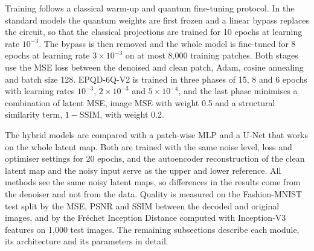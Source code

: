 Training follows a classical warm-up and quantum fine-tuning protocol. In the standard models the quantum weights are first frozen and a linear bypass replaces the circuit, so that the classical projections are trained for 10 epochs at learning rate $10^{-3}$. The bypass is then removed and the whole model is fine-tuned for 8 epochs at learning rate $3\times10^{-3}$ on at most 8,000 training patches. Both stages use the MSE loss between the denoised and clean patch, Adam, cosine annealing and batch size 128. EPQD-6Q-V2 is trained in three phases of 15, 8 and 6 epochs with learning rates $10^{-3}$, $2\times10^{-3}$ and $5\times10^{-4}$, and the last phase minimises a combination of latent MSE, image MSE with weight 0.5 and a structural similarity term, $1-\mathrm{SSIM}$, with weight 0.2.

The hybrid models are compared with a patch-wise MLP and a U-Net that works on the whole latent map. Both are trained with the same noise level, loss and optimiser settings for 20 epochs, and the autoencoder reconstruction of the clean latent map and the noisy input serve as the upper and lower reference. All methods see the same noisy latent maps, so differences in the results come from the denoiser and not from the data. Quality is measured on the Fashion-MNIST test split by the MSE, PSNR and SSIM between the decoded and original images, and by the Fr\'echet Inception Distance computed with Inception-V3 features on 1,000 test images. The remaining subsections describe each module, its architecture and its parameters in detail.

